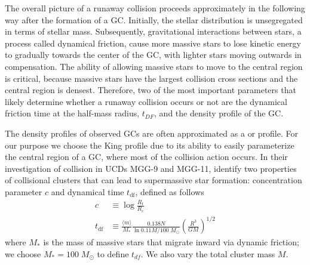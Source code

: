 \documentclass{princeton_astro_thesis}
\newcommand\Msun{\; M_\odot}
\newcommand\msun{\; M_\odot}
\numberwithin{equation}{section}
\begin{document}
The overall picture of a runaway collision proceeds approximately in the following way after the formation of a GC.
Initially, the stellar distribution is unsegregated in terms of stellar mass.
Subsequently, gravitational interactions between stars, a process called dynamical friction, cause more massive stars to lose
kinetic energy to gradually towards the center of the GC, with lighter stars moving outwards in compensation.
The ability of allowing massive stars to move to the central region is critical, because
massive stars have the largest collision cross sections and the central region is densest.
Therefore, two of the most important parameters that likely determine whether
a runaway collision occurs or not 
are the dynamical friction time at the half-mass radius, $t_{DF}$, and the density profile of the GC.

The density profiles of observed GCs are often approximated as 
a \citet[][]{1911Plummer} or \citet[][]{1962King} profile.
For our purpose we choose the King profile due to its ability to easily parameterize
the central region of a GC, where most of the collision action occurs.
In their investigation of collision in 
UCDs MGG-9 and MGG-11, \citet{2004SPZ} identify two properties of collisional clusters that can lead to supermassive star formation: 
concentration parameter $c$ and dynamical time $t_{\mathrm{df}}$, defined as follows
\begin{subequations}
    \begin{align}
    c &\equiv \log{\frac{R_t}{R_c}} \\
    t_{\mathrm{df}} &\equiv \frac{\langle m \rangle}{M_*} \frac{0.138N}{\ln{0.11M/100\Msun}}\left(\frac{R^3}{GM}\right)^{1/2}
    \end{align}
    \label{eqn:tdf}
\end{subequations} 
\noindent
where $M_*$ is the mass of massive stars that migrate inward via dynamic friction;
we choose $M_*=100\msun$ to define $t_{df}$.  We also vary the total cluster mass $M$.
\end{document}

